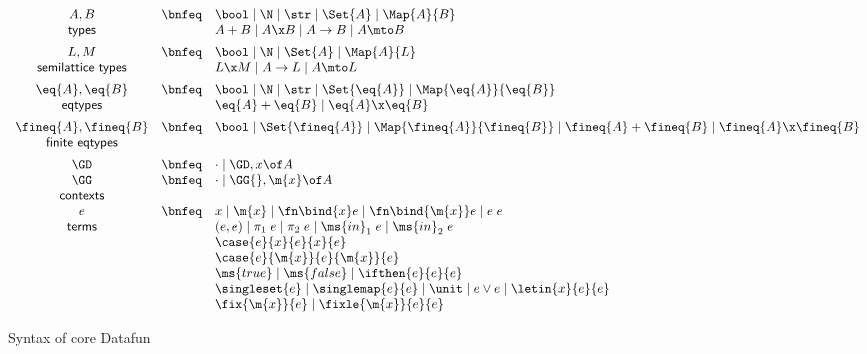 \begin{figure}
  \[\begin{array}{ccl}
    A, B     &\bnfeq& \bool \pipe \N \pipe \str \pipe \Set{A}
                      \pipe \Map{A}{B}
    \\
    \textsf{types} && A + B \pipe A \x B \pipe A \uto B \pipe A \mto B
    \vspace{0.5em}\\
    L, M         &\bnfeq& \bool \pipe \N \pipe \Set{A} \pipe \Map{A}{L}
    \\
    \textsf{semilattice types} && L \x M \pipe A \uto L \pipe A \mto L
    \vspace{0.5em}\\
    \eq{A}, \eq{B} &\bnfeq& \bool \pipe \N \pipe \str \pipe \Set{\eq{A}}
                            \pipe \Map{\eq{A}}{\eq{B}}
    \\
    \textsf{eqtypes} && \eq{A} + \eq{B} \pipe \eq{A} \x \eq{B}
    \vspace{0.5em}\\
    \fineq{A},\fineq{B}
    &\bnfeq& \bool \pipe \Set{\fineq{A}}
       \pipe \Map{\fineq{A}}{\fineq{B}}
       \pipe \fineq{A} + \fineq{B} \pipe \fineq{A} \x \fineq{B}\\
    \textsf{finite eqtypes}
    \vspace{0.5em}\\
    \GD &\bnfeq& \cdot \pipe \GD, x\of A\\
    \GG &\bnfeq& \cdot \pipe \GG{},\m{x}\of A\\
    \textsf{contexts}\\
    e &\bnfeq& x \pipe \m{x} \pipe \fn\bind{x} e \pipe \fn\bind{\m{x}} e
    \pipe e\;e\\
    \textsf{terms}
    && (e,e) \pipe \pi_1\;e \pipe \pi_2\;e
    \pipe \ms{in}_1\;e \pipe \ms{in}_2\;e\\
    && \case{e}{x}{e}{x}{e}\\
    && \case{e}{\m{x}}{e}{\m{x}}{e}\\
    && \ms{true} \pipe \ms{false} \pipe \ifthen{e}{e}{e}\\
    && \singleset{e} \pipe \singlemap{e}{e}
       \pipe \unit \pipe e \vee e \pipe \letin{x}{e}{e}\\
    && \fix{\m{x}}{e} \pipe \fixle{\m{x}}{e}{e}
  \end{array}\]
  \caption{Syntax of core Datafun}
  \label{fig:syntax}
\end{figure}


